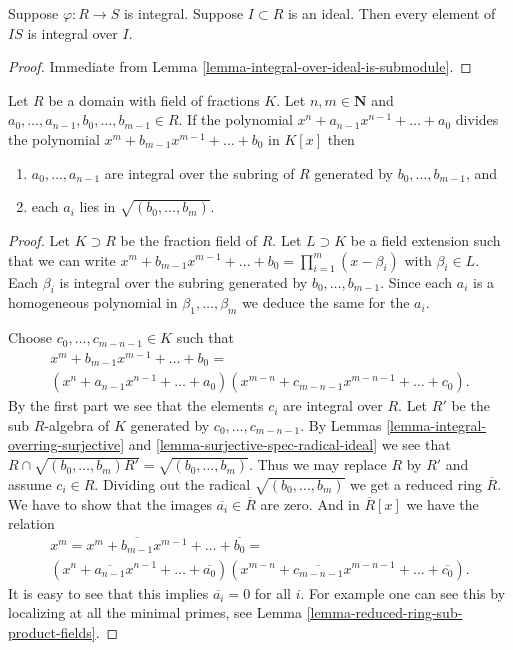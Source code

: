 \begin{lemma}
\label{lemma-integral-integral-over-ideal}
Suppose $\varphi : R \to S$ is integral.
Suppose $I \subset R$ is an ideal.
Then every element of $IS$ is integral over $I$.
\end{lemma}

\begin{proof}
Immediate from Lemma \ref{lemma-integral-over-ideal-is-submodule}.
\end{proof}

\begin{lemma}
\label{lemma-polynomials-divide}
Let $R$ be a domain with field of fractions $K$.
Let $n, m \in \mathbf{N}$ and
$a_0, \ldots, a_{n-1}, b_0, \ldots, b_{m-1} \in R$.
If the polynomial $x^n + a_{n-1}x^{n-1} + \ldots + a_0$
divides the polynomial $x^m + b_{m-1} x^{m-1} + \ldots + b_0$
in $K[x]$ then
\begin{enumerate}
\item $a_0, \ldots, a_{n-1}$ are integral over the subring
of $R$ generated by $b_0, \ldots, b_{m-1}$, and
\item each $a_i$ lies in $\sqrt{(b_0, \ldots, b_m)}$.
\end{enumerate}
\end{lemma}

\begin{proof}
Let $K \supset R$ be the fraction field of $R$.
Let $L \supset K$ be a field extension such that
we can write $x^m + b_{m-1} x^{m-1} + \ldots + b_0 =
\prod_{i = 1}^m (x-\beta_i)$ with $\beta_i \in L$.
Each $\beta_i$ is integral over the subring generated
by $b_0, \ldots, b_{m-1}$. Since each $a_i$ is a
homogeneous polynomial in $\beta_1, \ldots, \beta_m$
we deduce the same for the $a_i$.

\medskip\noindent
Choose $c_0, \ldots, c_{m-n-1} \in K$ such that
$$
\begin{matrix}
x^m + b_{m-1} x^{m-1} + \ldots + b_0 =  \\
(x^n + a_{n-1}x^{n-1} + \ldots + a_0)
(x^{m-n} + c_{m-n-1}x^{m-n-1}+ \ldots + c_0).
\end{matrix}
$$
By the first part we see that the elements $c_i$
are integral over $R$. Let $R'$ be the sub $R$-algebra
of $K$ generated by $c_0, \ldots, c_{m-n-1}$.
By Lemmas \ref{lemma-integral-overring-surjective}
and \ref{lemma-surjective-spec-radical-ideal}
we see that $R \cap \sqrt{(b_0, \ldots, b_m)R'}
= \sqrt{(b_0, \ldots, b_m)}$. Thus we may replace
$R$ by $R'$ and assume $c_i \in R$.
Dividing out the radical $\sqrt{(b_0, \ldots, b_m)}$
we get a reduced ring $\overline{R}$.
We have to show that the images $\overline{a_i} \in \overline{R}$
are zero. And in
$\overline{R}[x]$ we have the relation
$$
\begin{matrix}
x^m = x^m + \overline{b_{m-1}} x^{m-1} + \ldots + \overline{b_0} = \\
(x^n + \overline{a_{n-1}}x^{n-1} + \ldots + \overline{a_0})
(x^{m-n} + \overline{c_{m-n-1}}x^{m-n-1}+ \ldots + \overline{c_0}).
\end{matrix}
$$
It is easy to see that this implies $\overline{a_i} = 0$ for all $i$.
For example one can see this by localizing at all the minimal
primes, see Lemma \ref{lemma-reduced-ring-sub-product-fields}.
\end{proof}

